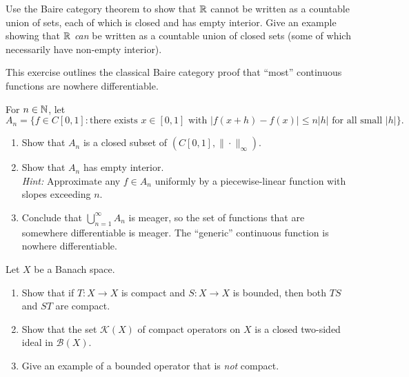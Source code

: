 \documentclass[11pt,a4paper]{article}
\begin{document}
\begin{exercise}
\label{ex:baire_app}
Use the Baire category theorem to show that $\mathbb{R}$ cannot be written as a
countable union of sets, each of which is closed and has empty interior.
Give an example showing that $\mathbb{R}$ \emph{can} be written as a countable
union of closed sets (some of which necessarily have non-empty interior).
\end{exercise}

\begin{exercise}
\label{ex:nowhere_diff}
This exercise outlines the classical Baire category proof that ``most''
continuous functions are nowhere differentiable.

For $n \in \mathbb{N}$, let
\[
A_n = \bigl\{f \in C[0,1] : \text{there exists } x \in [0,1]
\text{ with } |f(x+h) - f(x)| \le n|h|
\text{ for all small } |h|\bigr\}.
\]
\begin{enumerate}[label=(\alph*),nosep]
    \item Show that $A_n$ is a closed subset of $(C[0,1], \|\cdot\|_\infty)$.
    \item Show that $A_n$ has empty interior. \\
          \textit{Hint:} Approximate any $f \in A_n$ uniformly by a
          piecewise-linear function with slopes exceeding $n$.
    \item Conclude that $\bigcup_{n=1}^\infty A_n$ is meager, so the set
          of functions that are somewhere differentiable is meager. The
          ``generic'' continuous function is nowhere differentiable.
\end{enumerate}
\end{exercise}

\begin{exercise}
\label{ex:compact_ideal}
Let $X$ be a Banach space.
\begin{enumerate}[label=(\alph*),nosep]
    \item Show that if $T \colon X \to X$ is compact and $S \colon X \to X$
          is bounded, then both $TS$ and $ST$ are compact.
    \item Show that the set $\mathcal{K}(X)$ of compact operators on $X$ is a
          closed two-sided ideal in $\mathcal{B}(X)$.
    \item Give an example of a bounded operator that is \emph{not} compact.
\end{enumerate}
\end{exercise}
\end{document}

